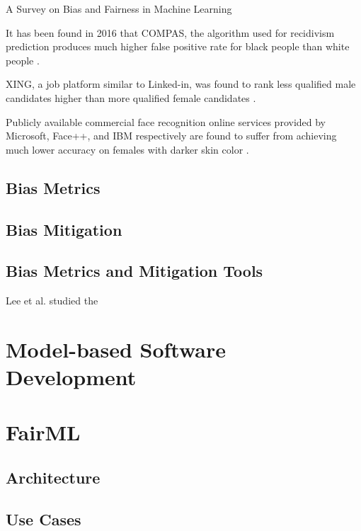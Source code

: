 \documentclass[final,5p,times,twocolumn]{elsarticle}
\begin{document}
A Survey on Bias and Fairness in Machine Learning

It has been found in 2016 that COMPAS, the algorithm used for recidivism prediction produces much higher false positive rate for black people than white people \cite{angwin2016machine}.

XING, a job platform similar to Linked-in, was found to rank less qualified male candidates higher than more qualified female candidates \cite{lahoti2019ifair}.

Publicly available commercial face recognition online services provided by Microsoft, Face++, and IBM respectively are found to suffer from achieving much lower accuracy on females with darker skin color \cite{buolamwini2018gender}.

\subsection{Bias Metrics}
\label{sec:bias_metrics}

\subsection{Bias Mitigation}
\label{sec:bias_mitigation}

\subsection{Bias Metrics and Mitigation Tools}
\label{sec:bias_metrics_and_mitigation_tools}

Lee et al. \cite{lee2021landscape} studied the 

\section{Model-based Software Development}
\label{sec:model_based_software_development}

\section{FairML}
\label{sec:fairml}

\subsection{Architecture}
\label{sec:architecture}

\subsection{Use Cases}
\label{sec:use_Cases}
\end{document}
